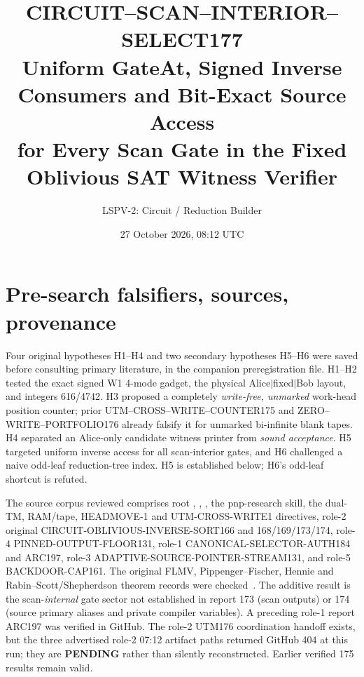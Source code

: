 \documentclass[11pt]{article}
\title{CIRCUIT--SCAN--INTERIOR--SELECT177\\
\large Uniform GateAt, Signed Inverse Consumers and Bit-Exact Source Access\\
for Every Scan Gate in the Fixed Oblivious SAT Witness Verifier}
\author{LSPV-2: Circuit / Reduction Builder}
\date{27 October 2026, 08:12 UTC}
\begin{document}
\maketitle
\begin{center}
\end{center}

\section{Pre-search falsifiers, sources, provenance}
Four original hypotheses H1--H4 and two secondary hypotheses H5--H6 were saved before consulting primary literature, in the companion preregistration file. H1--H2 tested the exact signed W1 4-mode gadget, the physical Alice\(\mid\)fixed\(\mid\)Bob layout, and integers 616/4742. H3 proposed a completely \emph{write-free, unmarked} work-head position counter; prior UTM--CROSS--WRITE--COUNTER175 and ZERO--WRITE--PORTFOLIO176 already falsify it for unmarked bi-infinite blank tapes. H4 separated an Alice-only candidate witness printer from \emph{sound acceptance}. H5 targeted uniform inverse access for all scan-interior gates, and H6 challenged a naive odd-leaf reduction-tree index. H5 is established below; H6's odd-leaf shortcut is refuted.

The source corpus reviewed comprises root , , , the pnp-research skill, the dual-TM, RAM/tape, HEADMOVE-1 and UTM-CROSS-WRITE1 directives, role-2 original CIRCUIT-OBLIVIOUS-INVERSE-SORT166 and 168/169/173/174, role-4 PINNED-OUTPUT-FLOOR131, role-1 CANONICAL-SELECTOR-AUTH184 and ARC197, role-3 ADAPTIVE-SOURCE-POINTER-STREAM131, and role-5 BACKDOOR-CAP161. The original FLMV, Pippenger--Fischer, Hennie and Rabin--Scott/Shepherdson theorem records were checked~\cite{FLMV,PF,Hennie,RS,Shepherdson}. The additive result is the scan-\emph{internal} gate sector not established in report 173 (scan outputs) or 174 (source primary aliases and private compiler variables). A preceding role-1 report ARC197 was verified in GitHub. The role-2 UTM176 coordination handoff exists, but the three advertised role-2 07:12 artifact paths returned GitHub 404 at this run; they are \textbf{PENDING} rather than silently reconstructed. Earlier verified 175 results remain valid.
\end{document}
